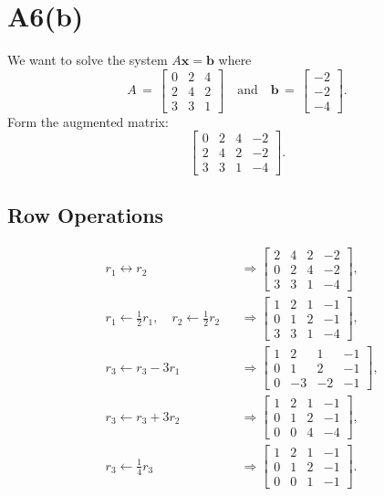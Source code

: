 \documentclass{article}
\begin{document}
\section*{A6(b)}
We want to solve the system \(A\mathbf{x} = \mathbf{b}\) where
\[
A 
\,=\, 
\begin{bmatrix}
0 & 2 & 4\\
2 & 4 & 2\\
3 & 3 & 1
\end{bmatrix}
\quad\text{and}\quad
\mathbf{b}
\,=\,
\begin{bmatrix}
-2\\
-2\\
-4
\end{bmatrix}.
\]
Form the augmented matrix:
\[
\left[
\begin{array}{ccc|c}
0 & 2 & 4 & -2\\
2 & 4 & 2 & -2\\
3 & 3 & 1 & -4
\end{array}
\right].
\]

\subsection*{Row Operations}
\begin{align*}
& r_1 \longleftrightarrow r_2 
&&\Longrightarrow 
\left[
\begin{array}{ccc|c}
2 & 4 & 2 & -2\\
0 & 2 & 4 & -2\\
3 & 3 & 1 & -4
\end{array}
\right],\\[6pt]
& r_1 \leftarrow \tfrac{1}{2}r_1,\quad
  r_2 \leftarrow \tfrac{1}{2}r_2 
&&\Longrightarrow
\left[
\begin{array}{ccc|c}
1 & 2 & 1 & -1\\
0 & 1 & 2 & -1\\
3 & 3 & 1 & -4
\end{array}
\right],\\[6pt]
& r_3 \leftarrow r_3 - 3r_1 
&&\Longrightarrow
\left[
\begin{array}{ccc|c}
1 & 2 & 1 & -1\\
0 & 1 & 2 & -1\\
0 & -3 & -2 & -1
\end{array}
\right],\\[6pt]
& r_3 \leftarrow r_3 + 3r_2 
&&\Longrightarrow
\left[
\begin{array}{ccc|c}
1 & 2 & 1 & -1\\
0 & 1 & 2 & -1\\
0 & 0 & 4 & -4
\end{array}
\right],\\[6pt]
& r_3 \leftarrow \tfrac{1}{4}r_3 
&&\Longrightarrow
\left[
\begin{array}{ccc|c}
1 & 2 & 1 & -1\\
0 & 1 & 2 & -1\\
0 & 0 & 1 & -1
\end{array}
\right].
\end{align*}
\end{document}
